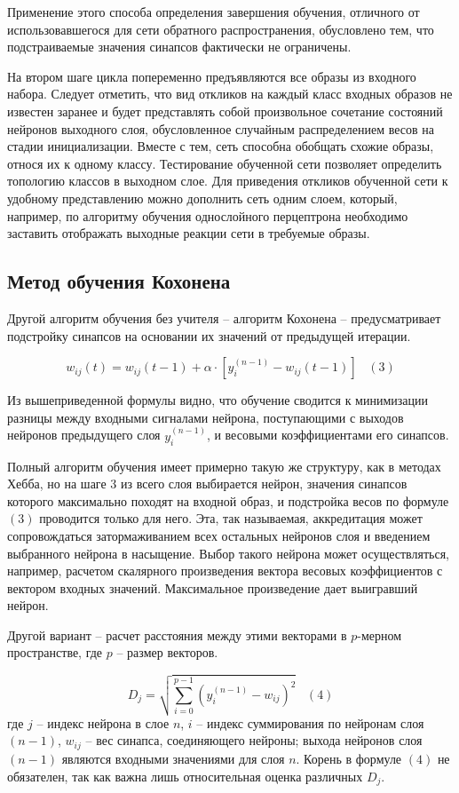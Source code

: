 \documentclass[bachelor, och, referat]{SCWorks}
\begin{document}
Применение этого способа определения завершения обучения, отличного от
использовавшегося для сети обратного распространения, обусловлено тем, что подстраиваемые
значения синапсов фактически не ограничены. 

На втором шаге цикла попеременно предъявляются все образы из входного набора.
Следует отметить, что вид откликов на каждый класс входных образов не известен
заранее и будет представлять собой произвольное сочетание состояний нейронов выходного
слоя, обусловленное случайным распределением весов на стадии инициализации. Вместе с тем,
сеть способна обобщать схожие образы, относя их к одному классу. Тестирование обученной
сети позволяет определить топологию классов в выходном слое. Для приведения откликов
обученной сети к удобному представлению можно дополнить сеть одним слоем, который,
например, по алгоритму обучения однослойного перцептрона необходимо заставить отображать
выходные реакции сети в требуемые образы.

\subsection{Метод обучения Кохонена}
Другой алгоритм обучения без учителя -- алгоритм Кохонена -- предусматривает
подстройку синапсов на основании их значений от предыдущей итерации. 

\[ w_{ij}(t) = w_{ij}(t - 1) + \alpha \cdot [y_i^{(n - 1)} - w_{ij}(t - 1)] \; \; \; (3) \]

Из вышеприведенной формулы видно, что обучение сводится к минимизации разницы
между входными сигналами нейрона, поступающими с выходов нейронов предыдущего слоя
$y_i^{(n - 1)}$, и весовыми коэффициентами его синапсов. 

Полный алгоритм обучения имеет примерно такую же структуру, как в методах Хебба,
но на шаге 3 из всего слоя выбирается нейрон, значения синапсов которого максимально
походят на входной образ, и подстройка весов по формуле $(3)$ проводится только для него. Эта,
так называемая, аккредитация может сопровождаться затормаживанием всех остальных
нейронов слоя и введением выбранного нейрона в насыщение. Выбор такого нейрона может
осуществляться, например, расчетом скалярного произведения вектора весовых коэффициентов
с вектором входных значений. Максимальное произведение дает выигравший нейрон. 

Другой вариант -- расчет расстояния между этими векторами в $p$-мерном пространстве,
где $p$ -- размер векторов.

\[ D_j = \sqrt{\sum_{i=0}^{p - 1}(y_i^{(n - 1)} - w_{ij})^2} \; \; \; (4) \]
где $j$ -- индекс нейрона в слое $n$, $i$ -- индекс суммирования по нейронам
слоя $(n - 1)$, $w_{ij}$ -- вес синапса, соединяющего нейроны;
выхода нейронов слоя $(n - 1)$ являются входными значениями для слоя $n$.
Корень в формуле $(4)$ не обязателен, так как важна лишь относительная
оценка различных $D_j$.
\end{document}
